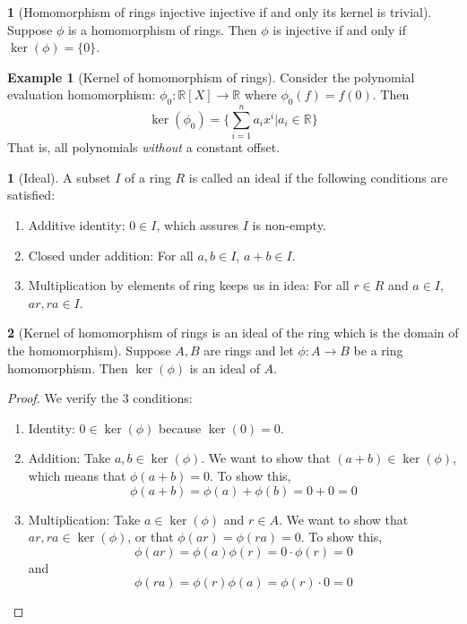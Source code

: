 \documentclass[12pt]{article}
\theoremstyle{definition}
\newtheorem{definition}{\color{NavyBlue}{\textbf{Definition}}}
\newtheorem{theorem}{\color{ForestGreen}{\textbf{Theorem}}}
\newcommand{\R}{\mathbb{R}}
\newtheorem{example}{\color{WildStrawberry}Example}
\theoremstyle{definition}
\begin{document}
\begin{theorem}[Homomorphism of rings injective injective if and only its kernel is trivial]
	Suppose $\phi$ is a homomorphism of rings. Then $\phi$ is injective if and only if $\ker(\phi) = \{0\}$.
\end{theorem}

\begin{example}[Kernel of homomorphism of rings]
	Consider the polynomial evaluation homomorphism: $\phi_0:\R[X] \to \R$ where $\phi_0(f) = f(0)$. Then
	\begin{equation}
		\ker(\phi_0) = \{\sum_{i=1}^n a_i x^i | a_i \in \R \}
	\end{equation}
	That is, all polynomials \emph{without} a constant offset.
\end{example}

\begin{definition}[Ideal]
	A subset $I$ of a ring $R$ is called an ideal if the following conditions are satisfied:
	\begin{enumerate}
		\item Additive identity: $0 \in I$, which assures $I$ is non-empty.
		\item Closed under addition: For all $a,b \in I$, $a+b \in I$.
		\item Multiplication by elements of ring keeps us in idea: For all $r \in R$ and $a \in I$, $ar, ra \in I$. 
	\end{enumerate}
\end{definition}

\begin{theorem}[Kernel of homomorphism of rings is an ideal of the ring which is the domain of the homomorphism]
	Suppose $A,B$ are rings and let $\phi:A \to B$ be a ring homomorphism. Then $\ker(\phi)$ is an ideal of $A$.
\end{theorem}
\begin{proof}
	We verify the $3$ conditions:
	\begin{enumerate}
		\item Identity: $0 \in \ker(\phi)$ because $\ker(0) = 0$.
		\item Addition: Take $a,b \in \ker(\phi)$. We want to show that $(a+b)\in\ker(\phi)$, which means that $\phi(a+b) = 0$. To show this,
		\begin{equation}
			\phi(a + b) = \phi(a) + \phi(b) = 0 + 0 = 0
		\end{equation}
		\item Multiplication: Take $a \in \ker(\phi)$ and $r \in A$. We want to show that $ar,ra \in \ker(\phi)$, or that $\phi(ar) = \phi(ra) = 0$. To show this,
		\begin{equation}
			\phi(ar) = \phi(a)\phi(r) = 0 \cdot \phi(r) = 0
		\end{equation}
		and 
		\begin{equation}
			\phi(ra) = \phi(r)\phi(a) = \phi(r) \cdot 0 = 0
		\end{equation}
	\end{enumerate}
\end{proof}
\end{document}

